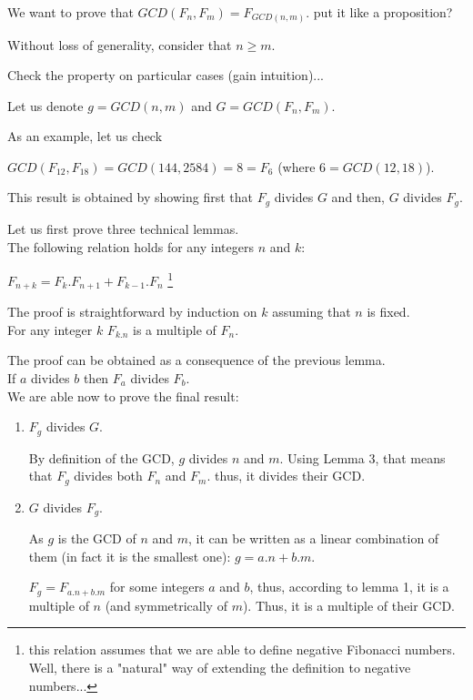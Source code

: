 \noindent We want to prove that $GCD(F_n,F_m) = F_{GCD(n,m)}$.
{\Denis put it like a proposition?}

Without loss of generality, consider that $n \geq m$.

Check the property on particular cases (gain intuition)...

Let us denote $g=GCD(n,m)$ and $G=GCD(F_n,F_m)$.

As an example, let us check 

$GCD(F_{12},F_{18}) = GCD(144,2584) = 8 = F_6$ (where $6=GCD(12,18)$).
\medskip

This result is obtained by showing first that $F_g$ divides $G$ and then, $G$ divides $F_g$.

Let us first prove three technical lemmas.
\\

The following relation holds for any integers $n$ and $k$:

$F_{n+k} = F_k.F_{n+1} + F_{k-1}.F_n$ \footnote{this relation assumes that we are able to define negative Fibonacci numbers. 
Well, there is a "natural" way of extending
the definition to negative numbers...}

The proof is straightforward  by induction on $k$ assuming that $n$ is fixed.
\\

For any integer $k$ $F_{k.n}$ is a multiple of $F_n$.

The proof can be obtained as a consequence of the previous lemma.
\\

If $a$ divides $b$ then $F_a$ divides $F_b$.
\\

We are able now to prove the final result:
\begin{enumerate}
\item $F_g$ divides $G$.

By definition of the GCD, $g$ divides $n$ and $m$. 
Using Lemma 3, that means that $F_g$ divides both $F_n$ and $F_m$.
thus, it divides their GCD.
\item $G$ divides $F_g$.

As $g$ is the GCD of $n$ and $m$, it can be written as a linear combination of them (in fact it is the smallest one):
$g = a.n + b.m$.

$F_g = F_{a.n + b.m}$ for some integers $a$ and $b$,
thus, according to lemma 1, it is a multiple of $n$ (and symmetrically of $m$).
Thus, it is a multiple of their GCD. 
\end{enumerate}






